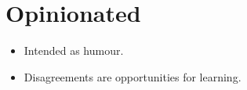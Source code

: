 \documentclass{article}
\begin{document}
\sloppy
\section{Opinionated}
\begin{itemize}
    \item Intended as humour.
    \item Disagreements are opportunities for learning.
\end{itemize}
\end{document}
